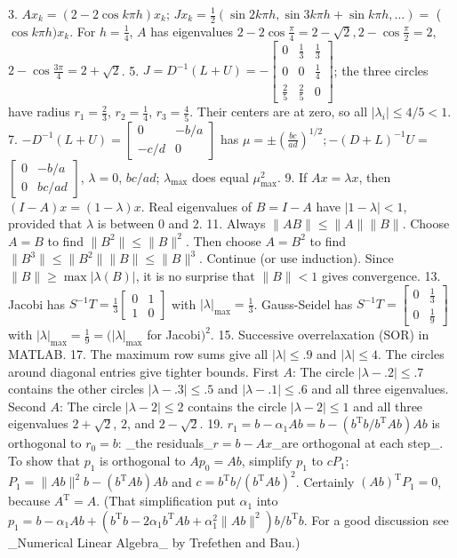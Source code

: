 3. \(Ax_{k}=(2-2\cos k\pi h)x_{k}\); \(Jx_{k}=\frac{1}{2}(\sin 2k\pi h,\sin 3k\pi h+\sin k\pi h,\ldots)=\) (\(\cos k\pi h)x_{k}\). For \(h=\frac{1}{4}\), \(A\) has eigenvalues \(2-2\cos\frac{\pi}{4}=2-\sqrt{2},2-\cos\frac{\pi}{2}=2\), \(2-\cos\frac{3\pi}{4}=2+\sqrt{2}\).
5. \(J=D^{-1}(L+U)=-\begin{bmatrix}0&\frac{1}{3}&\frac{1}{3}\\ 0&0&\frac{1}{4}\\ \frac{2}{5}&\frac{2}{5}&0\end{bmatrix}\); the three circles have radius \(r_{1}=\frac{2}{3}\), \(r_{2}=\frac{1}{4}\), \(r_{3}=\frac{4}{5}\). Their centers are at zero, so all \(|\lambda_{i}|\leq 4/5<1\).
7. \(-D^{-1}(L+U)=\begin{bmatrix}0&-b/a\\ -c/d&0\end{bmatrix}\) has \(\mu=\pm\left(\frac{bc}{ad}\right)^{1/2};-(D+L)^{-1}U=\) \(\begin{bmatrix}0&-b/a\\ 0&bc/ad\end{bmatrix}\), \(\lambda=0\), \(bc/ad\); \(\lambda_{\max}\) does equal \(\mu_{\max}^{2}\).
9. If \(Ax=\lambda x\), then \((I-A)x=(1-\lambda)x\). Real eigenvalues of \(B=I-A\) have \(|1-\lambda|<1\), provided that \(\lambda\) is between 0 and 2.
11. Always \(\|AB\|\leq\|A\|\|B\|\). Choose \(A=B\) to find \(\|B^{2}\|\leq\|B\|^{2}\). Then choose \(A=B^{2}\) to find \(\|B^{3}\|\leq\|B^{2}\|\|B\|\leq\|B\|^{3}\). Continue (or use induction). Since \(\|B\|\geq\max|\lambda(B)|\), it is no surprise that \(\|B\|<1\) gives convergence.
13. Jacobi has \(S^{-1}T=\frac{1}{3}\begin{bmatrix}0&1\\ 1&0\end{bmatrix}\) with \(|\lambda|_{\max}=\frac{1}{3}\). Gauss-Seidel has \(S^{-1}T=\begin{bmatrix}0&\frac{1}{3}\\ 0&\frac{1}{9}\end{bmatrix}\) with \(|\lambda|_{\max}=\frac{1}{9}=(|\lambda|_{\max}\) for Jacobi\()^{2}\).
15. Successive overrelaxation (SOR) in MATLAB.
17. The maximum row sums give all \(|\lambda|\leq.9\) and \(|\lambda|\leq 4\). The circles around diagonal entries give tighter bounds. First \(A\): The circle \(|\lambda-.2|\leq.7\) contains the other circles \(|\lambda-.3|\leq.5\) and \(|\lambda-.1|\leq.6\) and all three eigenvalues. Second \(A\): The circle \(|\lambda-2|\leq 2\) contains the circle \(|\lambda-2|\leq 1\) and all three eigenvalues \(2+\sqrt{2}\), \(2\), and \(2-\sqrt{2}\).
19. \(r_{1}=b-\alpha_{1}Ab=b-(b^{\mathrm{T}}b/b^{\mathrm{T}}Ab)Ab\) is orthogonal to \(r_{0}=b\): _the residuals_\(r=b-Ax\)_are orthogonal at each step_. To show that \(p_{1}\) is orthogonal to \(Ap_{0}=Ab\), simplify \(p_{1}\) to \(cP_{1}\): \(P_{1}=\|Ab\|^{2}b-(b^{\mathrm{T}}Ab)Ab\) and \(c=b^{\mathrm{T}}b/(b^{\mathrm{T}}Ab)^{2}\). Certainly \((Ab)^{\mathrm{T}}P_{1}=0\), because \(A^{\mathrm{T}}=A\). (That simplification put \(\alpha_{1}\) into \(p_{1}=b-\alpha_{1}Ab+(b^{\mathrm{T}}b-2\alpha_{1}b^{\mathrm{T}}Ab+\alpha_{1}^ {2}\|Ab\|^{2})b/b^{\mathrm{T}}b\). For a good discussion see _Numerical Linear Algebra_ by Trefethen and Bau.)

